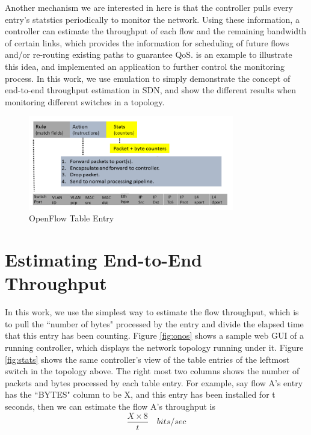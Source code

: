 \documentclass[12pt]{article}
\begin{document}
Another mechanism we are interested in here is that the controller pulls every entry's statstics periodically to monitor the network. Using these information, a controller can estimate the throughput of each flow and the remaining bandwidth of certain links, which provides the information for scheduling of future flows and/or re-routing existing paths to guarantee QoS. \cite{traffic} is an example to illustrate this idea, and \cite{opennetmon} implemented an application to further control the monitoring process. In this work, we use emulation to simply demonstrate the concept of end-to-end throughput estimation in SDN, and show the different results when monitoring different switches in a topology.  

\begin{figure}
  \centering
  \includegraphics[width=0.8\textwidth]{openflow.png}
  \caption{OpenFlow Table Entry}
  \label{fig:openflow}
\end{figure}


\section{Estimating End-to-End Throughput}

In this work, we use the simplest way to estimate the flow throughput, which is to pull the ``number of bytes" processed by the entry and divide the elapsed time that this entry has been counting. Figure \ref{fig:onos} shows a sample web GUI of a running controller, which displays the network topology running under it. Figure \ref{fig:stats} shows the same controller's view of the table entries of the leftmost switch in the topology above. The right most two columns shows the number of packets and bytes processed by each table entry. For example, say flow A's entry has the ``BYTES" column to be X, and this entry has been installed for t seconds, then we can estimate the flow A's throughput is
\begin{equation}
\frac{X \times 8}{t} \quad bits/sec
\end{equation}
\end{document}
